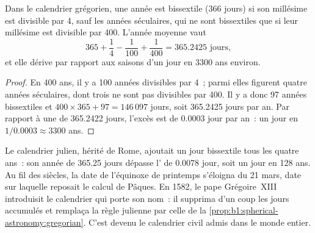 \begin{proposition}\label{prop:b1:spherical-astronomy:gregorian}
Dans le calendrier grégorien, une année est bissextile (366 jours) si son
millésime est divisible par 4, sauf les années séculaires, qui ne sont
bissextiles que si leur millésime est divisible par 400. L'année moyenne vaut
\[
  365 + \frac14 - \frac1{100} + \frac1{400} = \num{365.2425}\text{ jours},
\]
et elle dérive par rapport aux saisons d'un jour en 3300 ans environ.
\end{proposition}

\begin{proof}
En 400 ans, il y a 100 années divisibles par 4~; parmi elles figurent quatre
années séculaires, dont trois ne sont pas divisibles par 400. Il y a donc 97
années bissextiles et $400\times 365 + 97 = 146\,097$ jours,
soit 365.2425 jours par an. Par rapport à une  de 365.2422 jours,
l'excès est de 0.0003 jour par an~: un jour en $1/0.0003 \approx 3300$ ans.
\end{proof}

\begin{history}[La réforme de 1582]
Le calendrier julien, hérité de Rome, ajoutait un jour bissextile tous les
quatre ans~: son année de 365.25 jours dépasse l' de 0.0078 jour,
soit un jour en 128 ans. Au fil des siècles, la date de l'équinoxe de printemps
s'éloigna du 21 mars, date sur laquelle reposait le calcul de Pâques. En 1582,
le pape Grégoire~XIII introduisit le calendrier qui porte son nom~: il supprima
d'un coup les jours accumulés et remplaça la règle julienne par celle de la
\cref{prop:b1:spherical-astronomy:gregorian}. C'est devenu le calendrier civil
admis dans le monde entier.
\end{history}

